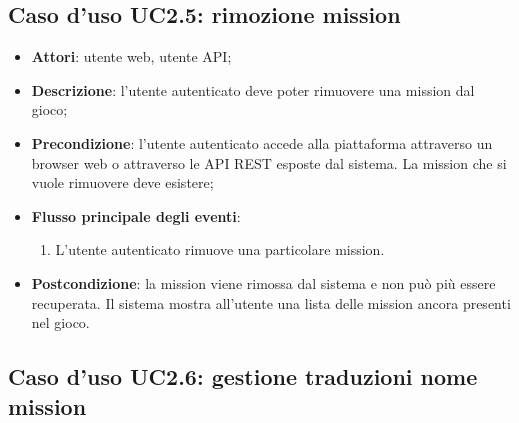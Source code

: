 \subsection{Caso d'uso UC2.5: rimozione mission}
\begin{itemize}
\item \textbf{Attori}: utente web, utente API;
\item \textbf{Descrizione}: l'utente autenticato deve poter rimuovere una mission dal gioco; 
      \item \textbf{Precondizione}: l'utente autenticato accede alla piattaforma attraverso un browser web o attraverso le API REST esposte dal sistema. La mission che si vuole rimuovere deve esistere;

        \item \textbf{Flusso principale degli eventi}:
          \begin{enumerate}
          \item L'utente autenticato rimuove una particolare mission.

      \end{enumerate}
    \item \textbf{Postcondizione}: la mission viene rimossa dal sistema e non può più essere recuperata. Il sistema mostra all'utente una lista delle mission ancora presenti nel gioco.
  \end{itemize}
\hypertarget{UC2.6}{}
\subsection{Caso d'uso UC2.6: gestione traduzioni nome mission}

